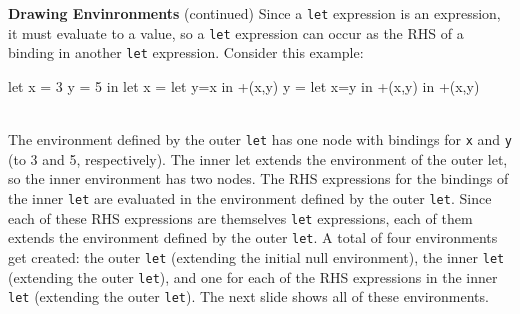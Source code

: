 \begin{minipage}[t]{\sw}
\slidenumber
\LARGE
{\bf Drawing Envinronments} (continued)\exx
Since a \verb'let' expression is an expression,
it must evaluate to a value,
so a \verb'let' expression can occur
as the RHS of a binding in another \verb'let' expression.
Consider this example:\exx
\Large
\begin{verbbox}
let %
  x = 3
  y = 5
in
  let %
    x = let y=x in +(x,y) %
    y = let x=y in +(x,y) %
  in
    +(x,y) %
\end{verbbox}
\emm\theverbbox\\
\LARGE
The environment defined by the outer \verb'let'
has one node with bindings for \verb'x' and \verb'y'
(to 3 and 5, respectively).
The inner let extends the environment of the outer let,
so the inner environment has two nodes.
The RHS expressions for the bindings of the inner \verb'let'
are evaluated in the environment defined by the outer \verb'let'.
Since each of these RHS expressions are themselves \verb'let' expressions,
each of them extends the environment defined by the outer \verb'let'.
A total of four environments get created:
the outer \verb'let' (extending the initial null environment),
the inner \verb'let' (extending the outer \verb'let'),
and one for each of the RHS expressions in the inner \verb'let'
(extending the outer \verb'let').
The next slide shows all of these environments.
\end{minipage}
\clearpage
